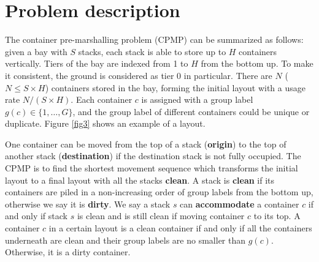 \documentclass[review,3p,times,authoryear,12pt]{elsarticle}
\begin{document}
%
%

\section{Problem description}
\label{sec:pd}

The container pre-marshalling problem (CPMP) can be summarized as follows: given a bay with $S$ stacks, each stack is able to store up to $H$ containers vertically. Tiers of the bay are indexed from 1 to $H$ from the bottom up. To make it consistent, the ground is considered as tier 0 in particular.
There are $N$ ($N\le S\times H$) containers stored in the bay, forming the initial layout with a usage rate $N/(S\times H)$. Each container $c$ is assigned with a group label $g(c)\in \{1,\dots,G\}$, and the group label of different containers could be unique or duplicate. Figure \ref{fig3} shows an example of a layout.

One container can be moved from the top of a stack (\textbf{origin}) to the top of another stack (\textbf{destination}) if the destination stack is not fully occupied.
The CPMP is to find the shortest movement sequence which transforms the initial layout to a final layout with all the stacks \textbf{clean}. A stack is \textbf{clean} if its containers are piled in a non-increasing order of group labels from the bottom up, otherwise we say it is \textbf{dirty}. We say a stack $s$ can \textbf{accommodate} a container $c$ if and only if stack $s$ is clean and is still clean if moving container $c$ to its top.
A container $c$ in a certain layout is a clean container if and only if all the containers underneath are clean and their group labels are no smaller than $g(c)$. Otherwise, it is a dirty container.
\end{document}
